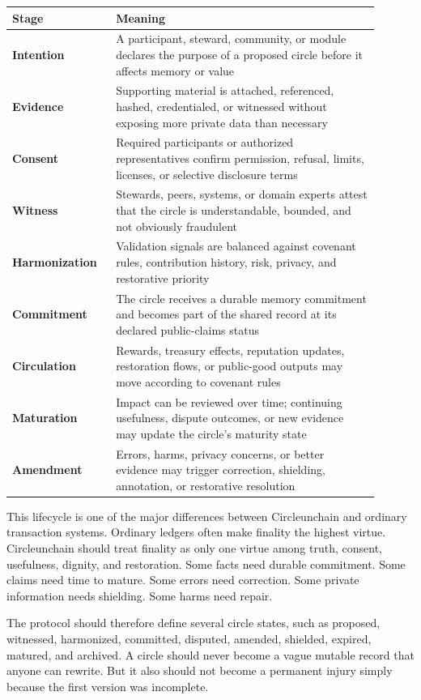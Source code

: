 \documentclass[12pt]{article}
\begin{document}
\begin{longtable}{>{\bfseries}p{0.24\linewidth}p{0.66\linewidth}}
\toprule
Stage & Meaning \\
\midrule
Intention & A participant, steward, community, or module declares the purpose of a proposed circle before it affects memory or value \\
Evidence & Supporting material is attached, referenced, hashed, credentialed, or witnessed without exposing more private data than necessary \\
Consent & Required participants or authorized representatives confirm permission, refusal, limits, licenses, or selective disclosure terms \\
Witness & Stewards, peers, systems, or domain experts attest that the circle is understandable, bounded, and not obviously fraudulent \\
Harmonization & Validation signals are balanced against covenant rules, contribution history, risk, privacy, and restorative priority \\
Commitment & The circle receives a durable memory commitment and becomes part of the shared record at its declared public-claims status \\
Circulation & Rewards, treasury effects, reputation updates, restoration flows, or public-good outputs may move according to covenant rules \\
Maturation & Impact can be reviewed over time; continuing usefulness, dispute outcomes, or new evidence may update the circle's maturity state \\
Amendment & Errors, harms, privacy concerns, or better evidence may trigger correction, shielding, annotation, or restorative resolution \\
\bottomrule
\end{longtable}

This lifecycle is one of the major differences between Circleunchain and ordinary transaction systems. Ordinary ledgers often make finality the highest virtue. Circleunchain should treat finality as only one virtue among truth, consent, usefulness, dignity, and restoration. Some facts need durable commitment. Some claims need time to mature. Some errors need correction. Some private information needs shielding. Some harms need repair.

The protocol should therefore define several circle states, such as proposed, witnessed, harmonized, committed, disputed, amended, shielded, expired, matured, and archived. A circle should never become a vague mutable record that anyone can rewrite. But it also should not become a permanent injury simply because the first version was incomplete.
\end{document}
